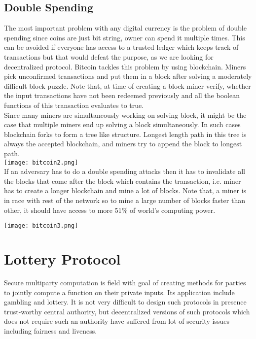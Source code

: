 \documentclass[a4paper]{article}
\begin{document}
\subsection{Double Spending}
The most important problem with any digital currency is the problem of double spending since coins are just bit string, owner can spend it multiple times. This can be avoided if everyone has access to a trusted ledger which keeps track of transactions but that would defeat the purpose, as we are looking for decentralized protocol. Bitcoin tackles this problem by using blockchain. Miners pick unconfirmed transactions and put them in a block after solving a moderately difficult block puzzle. Note that, at time of creating a block miner verify, whether the input transactions have not been redeemed previously and all the boolean functions of this transaction evaluates to true.\\
Since many miners are simultaneously working on solving block, it might be the case that multiple miners end up solving a block simultaneously. In such cases blockchain forks to form a tree like structure. Longest length path in this tree is always the accepted blockchain, and miners try to append the block to longest path.\\
\texttt{[image: bitcoin2.png]}
\\If an adversary has to do a double spending attacks then it has to invalidate all the blocks that come after the block which contains the transaction, i.e. miner has to create a longer blockchain and mine a lot of blocks. Note that, a miner is in race with rest of the network so to mine a large number of blocks faster than other, it should have access to more 51\% of world's computing power. 
\begin{center}
\texttt{[image: bitcoin3.png]}
\end{center}
\section{Lottery Protocol}
Secure multiparty computation is field with goal of creating methods for parties to jointly compute a function on their private inputs. Its application include gambling and lottery. It is not very difficult to design such protocols in presence trust-worthy central authority, but decentralized versions of such protocols which does not require such an authority have suffered from lot of security issues including fairness and liveness.\\
\end{document}
